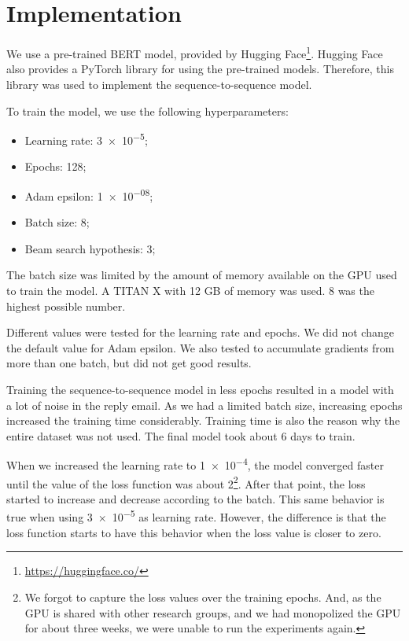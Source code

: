 \documentclass[letterpaper]{article}
\begin{document}
\section{Implementation}

We use a pre-trained BERT model, provided by Hugging Face\footnote{\href{https://huggingface.co/}{https://huggingface.co/}}. Hugging Face also provides a PyTorch library for using the pre-trained models. Therefore, this library was used to implement the sequence-to-sequence model.

To train the model, we use the following hyperparameters:

\begin{itemize}
    \item Learning rate: \num{3e-5};
    \item Epochs: \num{128};
    \item Adam epsilon: \num{1e-08};
    \item Batch size: \num{8};
    \item Beam search hypothesis: \num{3};
\end{itemize}

The batch size was limited by the amount of memory available on the GPU used to train the model. A TITAN X with 12 GB of memory was used. \num{8} was the highest possible number.

Different values were tested for the learning rate and epochs. We did not change the default value for Adam epsilon. We also tested to accumulate gradients from more than one batch, but did not get good results.

Training the sequence-to-sequence model in less epochs resulted in a model with a lot of noise in the reply email. As we had a limited batch size, increasing epochs increased the training time considerably. Training time is also the reason why the entire dataset was not used. The final model took about \num{6} days to train.

When we increased the learning rate to \num{1e-4}, the model converged faster until the value of the loss function was about \num{2}\footnote{We forgot to capture the loss values over the training epochs. And, as the GPU is shared with other research groups, and we had monopolized the GPU for about three weeks, we were unable to run the experiments again.}. After that point, the loss started to increase and decrease according to the batch. This same behavior is true when using \num{3e-5} as learning rate. However, the difference is that the loss function starts to have this behavior when the loss value is closer to zero.
\end{document}
